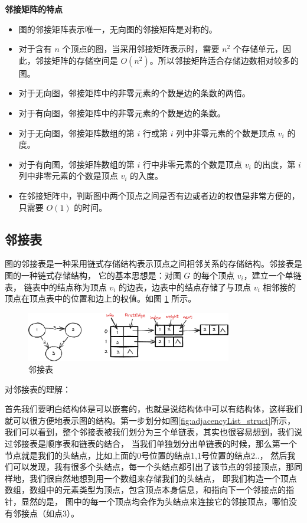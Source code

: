 \documentclass[lang=cn,newtx,10pt,scheme=chinese]{../elegantbook}
\begin{document}
\textbf{邻接矩阵的特点}

\begin{itemize}
  \item 图的邻接矩阵表示唯一，无向图的邻接矩阵是对称的。
  \item 对于含有 $n$ 个顶点的图，当采用邻接矩阵表示时，需要 $n^2$ 个存储单元，因此，邻接矩阵的存储空间是 $O(n^2)$。所以邻接矩阵适合存储边数相对较多的图。
  \item 对于无向图，邻接矩阵中的非零元素的个数是边的条数的两倍。
  \item 对于有向图，邻接矩阵中的非零元素的个数是边的条数。
  \item 对于无向图，邻接矩阵数组的第 $i$ 行或第 $i$ 列中非零元素的个数是顶点 $v_i$ 的度。
  \item 对于有向图，邻接矩阵数组的第 $i$ 行中非零元素的个数是顶点 $v_i$ 的出度，第 $i$ 列中非零元素的个数是顶点 $v_i$ 的入度。
  \item 在邻接矩阵中，判断图中两个顶点之间是否有边或者边的权值是非常方便的，只需要 $O(1)$ 的时间。
  \end{itemize}


\subsection{邻接表}
图的邻接表是一种采用链式存储结构表示顶点之间相邻关系的存储结构。邻接表是图的一种链式存储结构，
它的基本思想是：对图 $G$ 的每个顶点 $v_i$，建立一个单链表，
链表中的结点称为顶点 $v_i$ 的边表，边表中的结点存储了与顶点 $v_i$ 相邻接的顶点在顶点表中的位置和边上的权值。如图 \ref{fig:adjacencyList} 所示。

\begin{figure}[!htbp]
  \centering
  \includegraphics[width=0.8\textwidth]{./figure/pdf/cropped/adjacencyList.pdf}
  \caption{邻接表}
  \label{fig:adjacencyList}
\end{figure}

对邻接表的理解：

首先我们要明白结构体是可以嵌套的，也就是说结构体中可以有结构体，这样我们就可以很方便地表示图的结构。第一步划分如图\ref{fig:adjacencyList_struct}所示，
我们可以看到，整个邻接表被我们划分为三个单链表，其实也很容易想到，我们说过邻接表是顺序表和链表的结合，
当我们单独划分出单链表的时候，那么第一个节点就是我们的头结点，比如上面的0号位置的结点1,1号位置的结点2..，
然后我们可以发现，我有很多个头结点，每一个头结点都引出了该节点的邻接顶点，那同样地，我们很自然地想到用一个数组来存储我们的头结点，
即我们构造一个顶点数组，数组中的元素类型为顶点，包含顶点本身信息，和指向下一个邻接点的指针，显然的是，
图中的每一个顶点均会作为头结点来连接它的邻接顶点，哪怕没有邻接点（如点3）。
\end{document}
